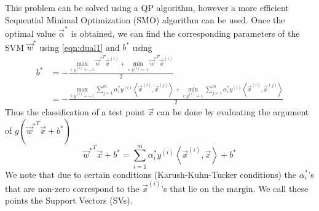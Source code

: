 This problem can be solved using a QP algorithm, however a more efficient Sequential Minimal Optimization (SMO) algorithm can be used. Once the optimal value  $\vec\alpha^\ast$ is obtained, we can find the corresponding parameters of the SVM $\vec w^\ast$ using \eqref{eqn:dual1} and $b^\ast$ using
	\begin{align}
		b^\ast 	& = - \frac{\max_{i: y^{(i)} = -1} {\vec w^*}^T \vec x ^{(i)} + \min_{i: y^{(i)} = 1} {\vec w^*}^T \vec x ^{(i)} }{2} \nonumber\\
				& = - \frac{\max_{i: y^{(i)} = -1} \sum_{j = 1}^{m} \alpha^\ast_i y^{(i)} \left\langle \vec{x}^{(i)}, \vec{x}^{(j)} \right\rangle + \min_{i: y^{(i)} = 1} \sum_{j = 1}^{m} \alpha^\ast_i y^{(i)} \left\langle \vec{x}^{(i)}, \vec{x}^{(j)} \right\rangle }{2} \label{eqn:bStar}
	\end{align}
Thus the classification of a test point $\vec x$ can be done by evaluating the argument of $g({\vec w^\ast}^T \vec x + b^\ast)$
	\begin{equation}
		{\vec w^\ast}^T \vec x + b^\ast = \sum_{i = 1}^{m} \alpha_i^\ast y^{(i)} \left\langle \vec{x}^{(i)}, \vec{x} \right\rangle + b^\ast
		\label{eqn:svmClassifier}
	\end{equation}
We note that due to certain conditions (Karush-Kuhn-Tucker conditions) the $\alpha^\ast_i$'s that are non-zero correspond to the $\vec x ^{(i)}$'s that lie on the margin. We call these points the Support Vectors (SVs). 

